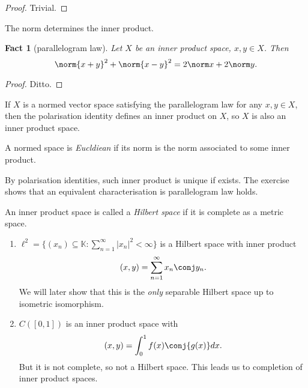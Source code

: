 \documentclass[a4paper]{article}
\newtheorem*{fact}{Fact}
\newcommand{\K}{{\mathbb{K}}} %
\begin{document}
\begin{proof}
  Trivial.
\end{proof}

\begin{corollary}
  The norm determines the inner product.
\end{corollary}

\begin{fact}[parallelogram law]
  Let \(X\) be an inner product space, \(x, y \in X\). Then
  \[
    \norm{x + y}^2 + \norm{x - y}^2 = 2 \norm x + 2 \norm y.
  \]
\end{fact}

\begin{proof}
  Ditto.
\end{proof}

\begin{ex}
  If \(X\) is a normed vector space satisfying the parallelogram law for any \(x, y \in X\), then the polarisation identity defines an inner product on \(X\), so \(X\) is also an inner product space.
\end{ex}

\begin{definition}[Euclidean]
  A normed space is \emph{Eucldiean} if its norm is the norm associated to some inner product.
\end{definition}

By polarisation identities, such inner product is unique if exists. The exercise shows that an equivalent characterisation is parallelogram law holds.

\begin{definition}
  An inner product space is called a \emph{Hilbert space} if it is complete as a metric space.
\end{definition}

\begin{eg}\leavevmode
  \begin{enumerate}
  \item \(\ell^2 = \{(x_n) \subseteq \K: \sum_{n = 1}^\infty |x_n|^2 < \infty\}\) is a Hilbert space with inner product
    \[
      (x, y) = \sum_{n = 1}^\infty x_n \conj y_n.
    \]
    We will later show that this is the \emph{only} separable Hilbert space up to isometric isomorphism.
  \item \(C([0, 1])\) is an inner product space with
    \[
      (x, y) = \int_0^1 f(x) \conj{g(x)} dx.
    \]
    But it is not complete, so not a Hilbert space. This leads us to completion of inner product spaces.
  \end{enumerate}
\end{eg}
\end{document}
